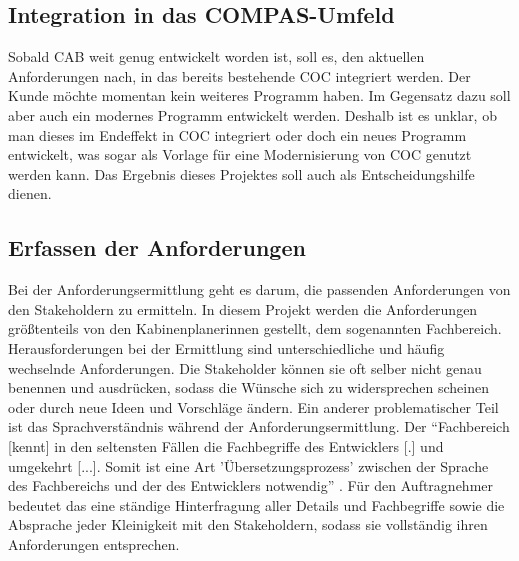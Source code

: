 \documentclass [12pt, a4paper, oneside, titlepage, ngerman]{article}
\begin{document}
\subsection{Integration in das COMPAS-Umfeld}
Sobald \ac{CAB} weit genug entwickelt worden ist, soll es, den aktuellen Anforderungen nach, in das bereits bestehende \ac{COC} integriert werden. Der Kunde möchte momentan kein weiteres Programm haben. %
Im Gegensatz dazu soll aber auch ein modernes Programm entwickelt werden. Deshalb ist es unklar, ob man dieses im Endeffekt in \ac{COC} integriert oder doch ein neues Programm entwickelt, was sogar als Vorlage für eine Modernisierung von \ac{COC} genutzt werden kann. Das Ergebnis dieses Projektes soll auch als Entscheidungshilfe dienen.\\



\subsection{Erfassen der Anforderungen} \label{anforderungen}
Bei der Anforderungsermittlung geht es darum, die passenden Anforderungen von den Stakeholdern zu ermitteln. In diesem Projekt werden die Anforderungen größtenteils von den Kabinenplanerinnen gestellt, dem sogenannten Fachbereich. \\

\noindent Herausforderungen bei der Ermittlung sind unterschiedliche und häufig wechselnde Anforderungen. Die Stakeholder können sie oft selber nicht genau benennen und ausdrücken, sodass die Wünsche sich zu widersprechen scheinen oder durch neue Ideen und Vorschläge ändern. %
Ein anderer problematischer Teil ist das Sprachverständnis während der Anforderungsermittlung. Der "`Fachbereich [kennt] in den seltensten Fällen die Fachbegriffe des Entwicklers [.] und umgekehrt [...]. Somit ist eine Art 'Übersetzungsprozess' zwischen der Sprache des Fachbereichs und der des Entwicklers notwendig"' \cite[S.319]{Alpar2016} . 
Für den Auftragnehmer bedeutet das eine ständige Hinterfragung aller Details und Fachbegriffe sowie die Absprache jeder Kleinigkeit mit den Stakeholdern, sodass sie vollständig ihren Anforderungen entsprechen. \\
\end{document}
